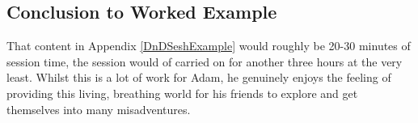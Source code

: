 \documentclass[review]{cmpreport}
\begin{document}
	\subsection{Conclusion to Worked Example}\label{DnDWEConc}
	That content in Appendix \ref{DnDSeshExample} would roughly be 20-30 minutes of session time, the session would of carried on for another three hours at the very least. Whilst this is a lot of work for Adam, he genuinely enjoys the feeling of providing this living, breathing world for his friends to explore and get themselves into many misadventures.
	
	\clearpage
	

\end{document}
